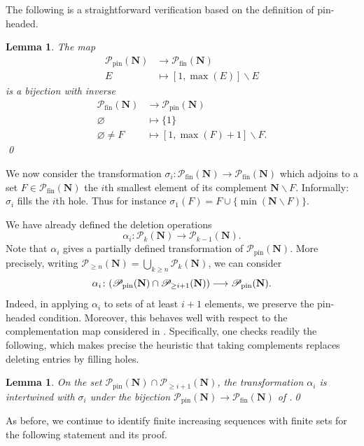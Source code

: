 \documentclass[12pt, pdflatex]{amsart}
\newtheorem{lemma}[theorem]{Lemma}
\theoremstyle{definition}
\numberwithin{equation}{section}
\numberwithin{theorem}{section}
\newcommand{\NN}{\mathbf{N}}
\newcommand{\sP}{\mathscr{P}}
\newcommand{\sPf}{\mathscr{P}_\mathrm{fin}}
\newcommand{\sPt}{\mathscr{P}_\mathrm{pin}}
\begin{document}
The following is a straightforward verification based on the definition of pin-headed.
\begin{lemma}\label{lemma:delete-fill}
The map
\begin{align*}
\sPt(\NN) &\longrightarrow \sPf(\NN)\\
E &\longmapsto [1, \max(E)] \smallsetminus E
\end{align*}
is a bijection with inverse
\begin{align*}
\sPf(\NN) &\longrightarrow \sPt(\NN)\\
\varnothing  &\longmapsto \{1\}\\
\varnothing \neq F &\longmapsto [1, \max(F) +1] \smallsetminus F.
\end{align*}\qed
\end{lemma}

We now consider the transformation $\sigma_i\colon \sPf(\NN) \to  \sPf(\NN)$ which adjoins to a set $F\in \sPf(\NN)$ the $i$th smallest element of its complement $\NN \smallsetminus F$. Informally: $\sigma_i$ fills the $i$th hole. Thus for instance $\sigma_1(F) = F \cup \{\min(\NN \smallsetminus F)\}$.

We have already defined the deletion operations
\begin{equation*}
\alpha_i \colon \sP_{k}(\NN) \longrightarrow \sP_{k-1}(\NN).
\end{equation*}
Note that $\alpha_i$ gives a partially defined transformation of $\sPt(\NN)$. More precisely, writing $\sP_{\geq n}(\NN)= \bigcup_{k\geq n} \sP_{k}(\NN)$, we can consider
\begin{equation}\label{eq_alpha_i}
\alpha_i \colon \mleft( \sPt(\NN) \cap \sP_{\geq i+1}(\NN) \mright) \longrightarrow \sPt(\NN).
\end{equation}
Indeed, in applying $\alpha_i$ to sets of at least $i+1$ elements, we preserve the pin-headed condition. Moreover, this behaves well with respect to the complementation map considered in . Specifically, one checks readily the following, which makes precise the heuristic that taking complements replaces deleting entries by filling holes.

\begin{lemma}\label{lem:alpha-sigma}
On the set $\sPt(\NN) \cap \sP_{\geq i+1}(\NN)$, the transformation $\alpha_i$ is intertwined with $\sigma_i$ under the bijection $\sPt(\NN) \to \sPf(\NN)$ of .\qed
\end{lemma}

As before, we continue to identify finite increasing sequences with finite sets for the following statement and its proof.
\end{document}
